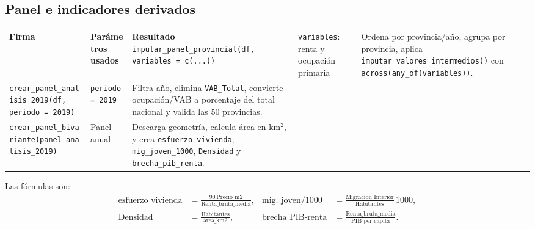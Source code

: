 \documentclass[10pt,a4paper]{article}
\newcommand{\code}[1]{\texttt{\small #1}}
\begin{document}
\subsection{Panel e indicadores derivados}
\begin{longtable}{p{}p{}p{}}
\toprule\textbf{Firma} & \textbf{Parámetros usados} & \textbf{Resultado}\
\midrule\endhead
\code{imputar\_panel\_provincial(df, variables = c(...))} & \code{variables}: renta y ocupación primaria & Ordena por provincia/año, agrupa por provincia, aplica \code{imputar\_valores\_intermedios()} con \code{across(any\_of(variables))}.\\
\code{crear\_panel\_analisis\_2019(df, periodo = 2019)} & \code{periodo = 2019} & Filtra año, elimina \code{VAB\_Total}, convierte ocupación/VAB a porcentaje del total nacional y valida las 50 provincias.\\
\code{crear\_panel\_bivariante(panel\_analisis\_2019)} & Panel anual & Descarga geometría, calcula área en km$^2$, y crea \code{esfuerzo\_vivienda}, \code{mig\_joven\_1000}, \code{Densidad} y \code{brecha\_pib\_renta}.\\
\bottomrule\end{longtable}

Las fórmulas son:
\[
\begin{aligned}
\text{esfuerzo vivienda} &= \frac{90\,\text{Precio\_m2}}{\text{Renta\_bruta\_media}}, &
\text{mig. joven/1000} &= \frac{\text{Migracion\_Interior}}{\text{Habitantes}}\,1000,\\
\text{Densidad} &= \frac{\text{Habitantes}}{\text{area\_km2}}, &
\text{brecha PIB-renta} &= \frac{\text{Renta\_bruta\_media}}{\text{PIB\_per\_capita}}.
\end{aligned}
\]
\end{document}
